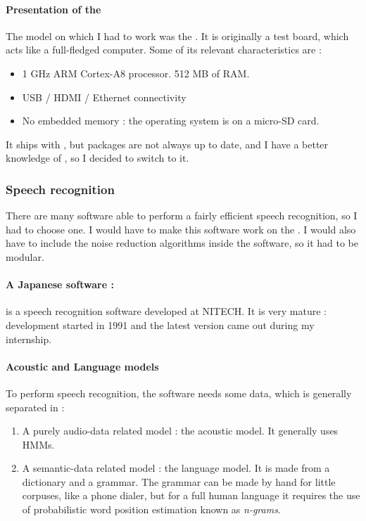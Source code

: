 \paragraph{Presentation of the }
The model on which I had to work was the . It is originally a  test board, which acts like a full-fledged computer. Some of its relevant characteristics are : 
\begin{itemize}
\item 1 GHz ARM Cortex-A8 processor. 512 MB of RAM.
\item USB / HDMI / Ethernet connectivity
\item No embedded memory : the operating system is on a micro-SD card.
\end{itemize}

It ships with , but packages are not always up to date, and I have a better knowledge of , so I decided to switch to it.

\subsubsection{Speech recognition}
There are many software able to perform a fairly efficient speech recognition, so I had to choose one. I would have to make this software work on the . I would also have to include the noise reduction algorithms inside the software, so it had to be modular.
\paragraph{A Japanese software : }
  is a speech recognition software developed at \ac{NITECH}. It is very mature : development started in 1991 and the latest version came out during my internship.
 
\paragraph{Acoustic and Language models}
To perform speech recognition, the software needs some data, which is generally separated 
in : 
\begin{enumerate}
\item A purely audio-data related model : the acoustic model. It generally uses \acp{HMM}.
\item A semantic-data related model : the language model. It is made from a dictionary and a grammar. The grammar can be made by hand for little corpuses, like a phone dialer, but for a full human language it requires the use of probabilistic word position estimation known as \textit{n-grams}.
\end{enumerate}

